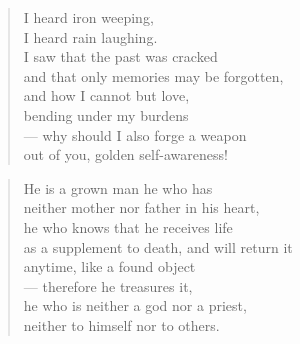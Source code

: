 
\begin{verse}
  I heard iron weeping, \\
  I heard rain laughing. \\
  I saw that the past was cracked \\
  and that only memories may be forgotten, \\
  and how I cannot but love, \\
  bending under my burdens \\
  --- why should I also forge a weapon \\
  out of you, golden self-awareness!
\end{verse}

\bigskip

\label{consciousness_X}

\begin{verse}
  He is a grown man he who has \\
  neither mother nor father in his heart, \\
  he who knows that he receives life \\
  as a supplement to death, and will return it \\
  anytime, like a found object \\
  --- therefore he treasures it, \\
  he who is neither a god nor a priest, \\
  neither to himself nor to others.
\end{verse}

\newpage


\vspace*{-15mm}
\centeredornament




